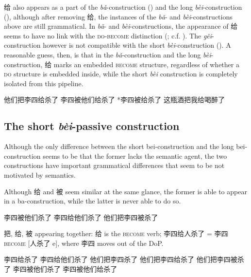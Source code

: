\documentclass[UTF8, a4paper, oneside, scheme=plain, 12pt]{ctexrep}
\newcommand{\form}[1]{\emph{#1}}
\newcommand*{\category}[1]{\textsc{#1}}
\begin{document}
给 also appears as a part of the \form{bǎ}-construction
()
and the long \form{bèi}-construction
(),
although after removing 给,
the instances of the \form{bǎ}- and \form{bèi}-constructions above 
are still grammatical.
In \form{bǎ}- and \form{bèi}-constructions, 
the appearance of 给 seems to have no link 
with the \category{do}-\category{become} distinction
(; c.f. ).
The \form{gěi}-construction however is not compatible 
with the short \form{bèi}-construction
().
A reasonable guess, then, 
is that in the \form{bǎ}-construction
and the long \form{bèi}-construction,
给 marks an embedded \category{become} structure,
regardless of whether a \category{do} structure is embedded inside,
while the short \form{bèi} construction is completely isolated 
from this pipeline.

\begin{exe}
    \ex\label{ex:verb-phrase.gei.ba-1} 他们把李四给杀了
    \ex\label{ex:verb-phrase.gei.bei-1} 李四被他们给杀了
    \ex\label{ex:verb-phrase.gei.bei-2} *李四被给杀了
    \ex\label{ex:verb-phrase.gei.ba-2} 这瓶酒把我给喝醉了
\end{exe}

\subsection{The short \form{bèi}-passive construction}\label{sec:verb-phrase.object.short-bei}

Although the only difference between the short bei-construction 
and the long bei-construction 
seems to be that the former lacks the semantic agent, 
the two constructions have important grammatical differences 
that seem to be not motivated by semantics. 

Although 给 and 被 seem similar at the same glance, 
the former is able to appear in a ba-construction, 
while the latter is never able to do so. 

\begin{exe}
    \ex 李四被他们杀了
    \ex 李四给他们杀了
    \ex *他们把李四被杀了
\end{exe}

把, 给, 被 appearing together: 给 is the \category{become} verb; 
李四给人杀了 = 李四 \category{become} [人杀了 e], 
where 李四 moves out of the DoP.

\begin{exe}
    \ex 李四给杀了
    \ex 李四给他们杀了
    \ex 他们把李四杀了
    \ex 他们把李四给杀了
    \ex *他们把李四被杀了
    \ex 李四被他们杀了
    \ex 李四被他们给杀了
\end{exe}
\end{document}
